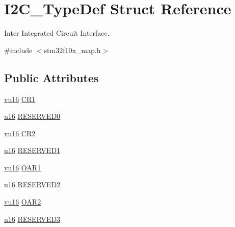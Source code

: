 \hypertarget{struct_i2_c___type_def}{}\section{I2\+C\+\_\+\+Type\+Def Struct Reference}
\label{struct_i2_c___type_def}


Inter Integrated Circuit Interface.  




{\ttfamily \#include $<$stm32f10x\+\_\+map.\+h$>$}

\subsection*{Public Attributes}
\begin{DoxyCompactItemize}
\item 
\hyperlink{agilefox_2library_2inc_2stm32f10x__type_8h_a9e9f2c67df0bbcd2dd7753693525ee07}{vu16} \hyperlink{struct_i2_c___type_def_a29d3a752d407b72755f4811abc91bd98}{C\+R1}
\item 
\hyperlink{agilefox_2library_2inc_2stm32f10x__type_8h_a9e6c91d77e24643b888dbd1a1a590054}{u16} \hyperlink{struct_i2_c___type_def_a9bec51ad82b1c93dfef45bcc97d50d19}{R\+E\+S\+E\+R\+V\+E\+D0}
\item 
\hyperlink{agilefox_2library_2inc_2stm32f10x__type_8h_a9e9f2c67df0bbcd2dd7753693525ee07}{vu16} \hyperlink{struct_i2_c___type_def_a4db1534c696d7f12497370063195a086}{C\+R2}
\item 
\hyperlink{agilefox_2library_2inc_2stm32f10x__type_8h_a9e6c91d77e24643b888dbd1a1a590054}{u16} \hyperlink{struct_i2_c___type_def_a9644e2d1404d3b767bbb7cf4599d0932}{R\+E\+S\+E\+R\+V\+E\+D1}
\item 
\hyperlink{agilefox_2library_2inc_2stm32f10x__type_8h_a9e9f2c67df0bbcd2dd7753693525ee07}{vu16} \hyperlink{struct_i2_c___type_def_ae416e4379e1eca4977ae136c30c22560}{O\+A\+R1}
\item 
\hyperlink{agilefox_2library_2inc_2stm32f10x__type_8h_a9e6c91d77e24643b888dbd1a1a590054}{u16} \hyperlink{struct_i2_c___type_def_a935ef29c8b24f239ed0ded3291b12273}{R\+E\+S\+E\+R\+V\+E\+D2}
\item 
\hyperlink{agilefox_2library_2inc_2stm32f10x__type_8h_a9e9f2c67df0bbcd2dd7753693525ee07}{vu16} \hyperlink{struct_i2_c___type_def_a69d85dedb2cf53a4db41153d8534524c}{O\+A\+R2}
\item 
\hyperlink{agilefox_2library_2inc_2stm32f10x__type_8h_a9e6c91d77e24643b888dbd1a1a590054}{u16} \hyperlink{struct_i2_c___type_def_ae4961ac9d0cbede263ee78d3333f1371}{R\+E\+S\+E\+R\+V\+E\+D3}

\end{DoxyCompactItemize}
